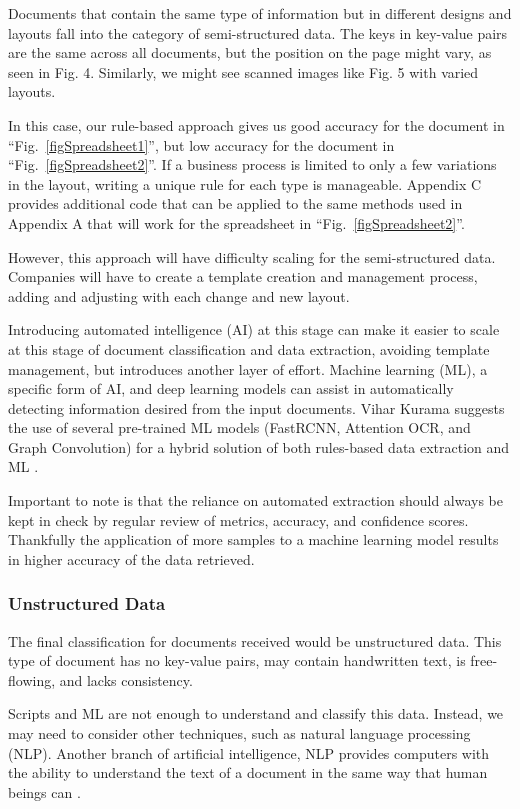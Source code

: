 \documentclass[conference]{IEEEtran}
\begin{document}
Documents that contain the same type of information but in different designs and layouts fall into the category of semi-structured data. The keys in key-value pairs are the same across all documents, but the position on the page might vary, as seen in Fig. 4. Similarly, we might see scanned images like Fig. 5 with varied layouts.

In this case, our rule-based approach gives us good accuracy for the document in ``Fig.~\ref{figSpreadsheet1}'', but low accuracy for the document in ``Fig.~\ref{figSpreadsheet2}''. If a business process is limited to only a few variations in the layout, writing a unique rule for each type is manageable. Appendix C provides additional code that can be applied to the same methods used in Appendix A that will work for the spreadsheet in ``Fig.~\ref{figSpreadsheet2}''.

However, this approach will have difficulty scaling for the semi-structured data. Companies will have to create a template creation and management process, adding and adjusting with each change and new layout.

Introducing automated intelligence (AI) at this stage can make it easier to scale at this stage of document classification and data extraction, avoiding template management, but introduces another layer of effort. Machine learning (ML), a specific form of AI, and deep learning models can assist in automatically detecting information desired from the input documents. Vihar Kurama suggests the use of several pre-trained ML models (FastRCNN, Attention OCR, and Graph Convolution) for a hybrid solution of both rules-based data extraction and ML \cite{kurama2021a}.

Important to note is that the reliance on automated extraction should always be kept in check by regular review of metrics, accuracy, and confidence scores. Thankfully the application of more samples to a machine learning model results in higher accuracy of the data retrieved.

\subsubsection{Unstructured Data}
The final classification for documents received would be unstructured data. This type of document has no key-value pairs, may contain handwritten text, is free-flowing, and lacks consistency.

Scripts and ML are not enough to understand and classify this data. Instead, we may need to consider other techniques, such as natural language processing (NLP). Another branch of artificial intelligence, NLP provides computers with the ability to understand the text of a document in the same way that human beings can \cite{ibm2020natural}.
\end{document}
